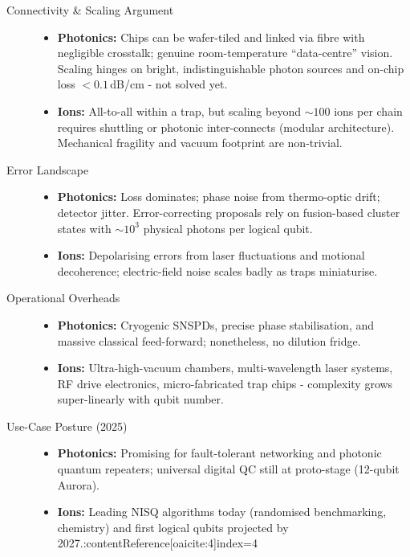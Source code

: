 \documentclass[11pt,a4paper]{article}
\begin{document}
\begin{description}
	\item[Connectivity \& Scaling Argument]
	\begin{itemize}
		\item \textbf{Photonics:} Chips can be wafer-tiled and linked via fibre with negligible crosstalk; genuine room-temperature “data-centre” vision.  Scaling hinges on bright, indistinguishable photon sources and on-chip loss $<\!0.1\,$dB/cm - not solved yet.
		\item \textbf{Ions:} All-to-all within a trap, but scaling beyond $\sim\!100$ ions per chain requires shuttling or photonic inter-connects (modular architecture).  Mechanical fragility and vacuum footprint are non-trivial.
	\end{itemize}
	
	\item[Error Landscape]
	\begin{itemize}
		\item \textbf{Photonics:} Loss dominates; phase noise from thermo-optic drift; detector jitter.  Error-correcting proposals rely on fusion-based cluster states with $\sim\!10^{3}$ physical photons per logical qubit.
		\item \textbf{Ions:} Depolarising errors from laser fluctuations and motional decoherence; electric-field noise scales badly as traps miniaturise.
	\end{itemize}
	
	\item[Operational Overheads]
	\begin{itemize}
		\item \textbf{Photonics:} Cryogenic SNSPDs, precise phase stabilisation, and massive classical feed-forward; nonetheless, no dilution fridge.
		\item \textbf{Ions:} Ultra-high-vacuum chambers, multi-wavelength laser systems, RF drive electronics, micro-fabricated trap chips - complexity grows super-linearly with qubit number.
	\end{itemize}
	
	\item[Use-Case Posture (2025)]
	\begin{itemize}
		\item \textbf{Photonics:} Promising for fault-tolerant networking and photonic quantum repeaters; universal digital QC still at proto-stage (12-qubit Aurora).
		\item \textbf{Ions:} Leading NISQ algorithms today (randomised benchmarking, chemistry) and first logical qubits projected by 2027.:contentReference[oaicite:4]{index=4}
	\end{itemize}
\end{description}
\end{document}
